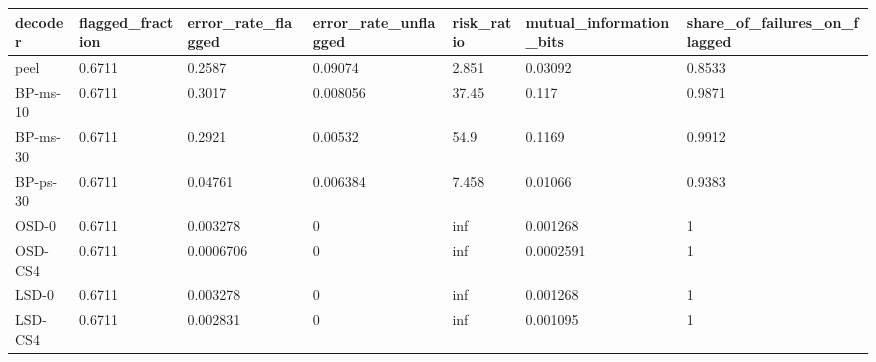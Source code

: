 \begin{tabular}{lllllll}
\hline
decoder & flagged\_fraction & error\_rate\_flagged & error\_rate\_unflagged & risk\_ratio & mutual\_information\_bits & share\_of\_failures\_on\_flagged \\
\hline
peel & 0.6711 & 0.2587 & 0.09074 & 2.851 & 0.03092 & 0.8533 \\
BP-ms-10 & 0.6711 & 0.3017 & 0.008056 & 37.45 & 0.117 & 0.9871 \\
BP-ms-30 & 0.6711 & 0.2921 & 0.00532 & 54.9 & 0.1169 & 0.9912 \\
BP-ps-30 & 0.6711 & 0.04761 & 0.006384 & 7.458 & 0.01066 & 0.9383 \\
OSD-0 & 0.6711 & 0.003278 & 0 & inf & 0.001268 & 1 \\
OSD-CS4 & 0.6711 & 0.0006706 & 0 & inf & 0.0002591 & 1 \\
LSD-0 & 0.6711 & 0.003278 & 0 & inf & 0.001268 & 1 \\
LSD-CS4 & 0.6711 & 0.002831 & 0 & inf & 0.001095 & 1 \\
\hline
\end{tabular}
